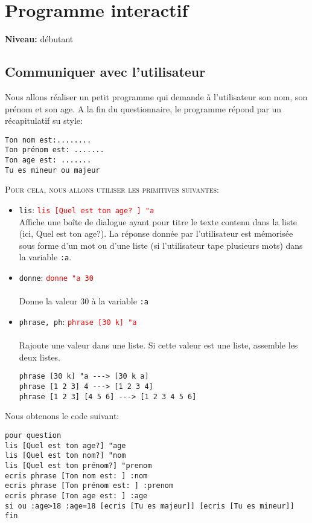 \chapter{Programme interactif}
{ }\hfill\textbf{Niveau:} débutant
\section{Communiquer avec l'utilisateur}
\noindent Nous allons réaliser un petit programme qui demande à l'utilisateur son nom, son prénom et son age. A la fin du questionnaire, le programme répond par un récapitulatif su style:
\begin{verbatim}
Ton nom est:........
Ton prénom est: .......
Ton age est: .......
Tu es mineur ou majeur
\end{verbatim}
\noindent \textsc{Pour cela, nous allons utiliser les primitives suivantes:}  \\
\begin{itemize}
\item \texttt{lis}:\hspace{4cm}  \textcolor{red}{ \texttt{lis [Quel est ton age? ] "a}}\\
Affiche une boîte de dialogue ayant pour titre le texte contenu dans la liste (ici, \og Quel est ton age?\fg). La réponse donnée par l'utilisateur est mémorisée sous forme d'un mot ou d'une liste (si l'utilisateur tape plusieurs mots) dans la variable \texttt{:a}.\\
\item \texttt{donne}:\hspace{4cm}  \textcolor{red}{ \texttt{donne "a 30}}\\ \\
Donne la valeur 30 à la variable \texttt{:a}\\
\item \texttt{phrase, ph}:\hspace{4cm}  \textcolor{red}{ \texttt{phrase [30 k] "a }}\\ \\
Rajoute une valeur dans une liste. Si cette valeur est une liste, assemble les deux listes.\\ 
\begin{verbatim}
phrase [30 k] "a ---> [30 k a]
phrase [1 2 3] 4 ---> [1 2 3 4]
phrase [1 2 3] [4 5 6] ---> [1 2 3 4 5 6]

\end{verbatim} 
\end{itemize}
Nous obtenons le code suivant:
\begin{verbatim}
pour question
lis [Quel est ton age?] "age
lis [Quel est ton nom?] "nom
lis [Quel est ton prénom?] "prenom
ecris phrase [Ton nom est: ] :nom
ecris phrase [Ton prénom est: ] :prenom
ecris phrase [Ton age est: ] :age
si ou :age>18 :age=18 [ecris [Tu es majeur]] [ecris [Tu es mineur]]
fin
\end{verbatim}
